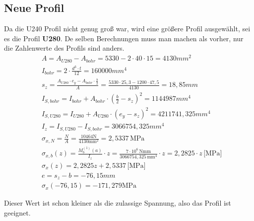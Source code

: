 \subsection{Neue Profil}
Da die U240 Profil nicht genug groß war, wird eine größere Profil ausgewählt, sei es die Profil \textbf{U280}.
De selben Berechnungen muss man machen als vorher, nur die Zahlenwerte des Profils sind anders.
\begin{align*}
  &A = A_{U280} - A_{bohr} = 5330 - 2 \cdot 40 \cdot 15 = 4130 mm^2 \\
  &I_{bohr} = 2 \cdot \frac{d^3 \cdot t}{12} = 160000 mm^4 \\
  &s_z = \frac{A_{U280} \cdot e_y - A_{bohr} \cdot \frac{b}{2}}{A} = \frac{5330 \cdot 25,3 - 1200 \cdot 47,5}{4130} = 18,85mm \\
  &I_{S,bohr} = I_{bohr} + A_{bohr} \cdot (\frac{b}{2} - s_z)^2 = 1144987 mm^4 \\
  &I_{S,U280} = I_{U280} + A_{U280} \cdot (e_y - s_z)^2 = 4211741,325 mm^4 \\
  &I_z = I_{S,U280} - I_{S,bohr} = 3066754,325 mm^4 \\
  &\sigma_{x,N} = \frac{N}{A} = \frac{10464 \text{N}}{4130 \text{mm}^2} = 2,5337 \, \text{MPa} \\
  &\sigma_{x,b}(z) = \frac{M_{b}^{(1)}(a)}{I_{z}} \cdot z = \frac{7 \cdot 10^6 \, \text{Nmm}}{3066754,325 \, \text{mm}^4} \cdot z = 2,2825 \cdot z \, \text{[MPa]} \\
  &\sigma_x(z) = 2,2825z + 2,5337 \, \text{[MPa]} \\
  &e = s_z - b = -76,15 mm \\
  &\sigma_x(-76,15) = -171,279 \text{MPa}
\end{align*}

Dieser Wert ist schon kleiner als die zulassige Spannung, also das Profil ist geeignet.

